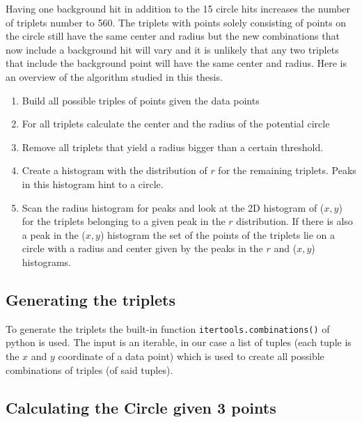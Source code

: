 \documentclass[11pt,twoside]{scrreprt}
\begin{document}
Having one background hit in addition to the 15 circle hits increases the number of triplets number to 560. The triplets with points solely consisting of points on the circle still have the same center and radius but the new combinations that now include a background hit will vary and it is unlikely that any two triplets that include the background point will have the same center and radius. Here is an overview of the algorithm studied in this thesis.

\begin{enumerate}
\item Build all possible triples of points given the data points
\item For all triplets calculate the center and the radius of the potential circle
\item Remove all triplets that yield a radius bigger than a certain threshold.
\item Create a histogram with the distribution of $r$ for the remaining triplets. Peaks in this histogram hint to a circle.
\item Scan the radius histogram for peaks and look at the 2D histogram of ($x,y$) for the triplets belonging to a given peak in the $r$ distribution. If there is also a peak in the ($x,y$) histogram the set of the points of the triplets lie on a circle with a radius and center given by the peaks in the $r$
and ($x,y$) histograms.
\end{enumerate}

\subsection{Generating the triplets} %
\label{sub:generating_the_triples}
To generate the triplets the built-in function \texttt{itertools.combinations()} of python is used. The input is an iterable, in our case a
list of tuples (each tuple is the $x$ and $y$ coordinate of a data point) which is used to create all possible combinations of triples (of said tuples).


\subsection{Calculating the Circle given 3 points}
\end{document}
